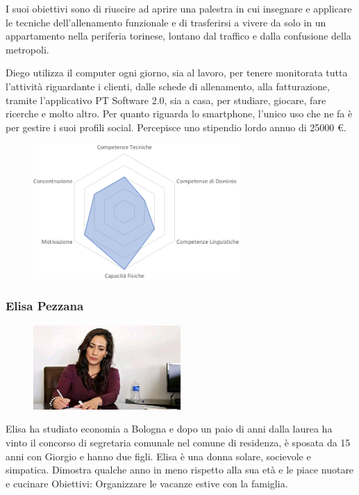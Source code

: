 \documentclass[12pt,italian,]{report}
\begin{document}
I suoi obiettivi sono di riuscire ad aprire una palestra in cui
insegnare e applicare le tecniche dell'allenamento funzionale e di
trasferirsi a vivere da solo in un appartamento nella periferia
torinese, lontano dal traffico e dalla confusione della metropoli.

Diego utilizza il computer ogni giorno, sia al lavoro, per tenere
monitorata tutta l'attività riguardante i clienti, dalle schede di
allenamento, alla fatturazione, tramite l'applicativo PT Software 2.0,
sia a casa, per studiare, giocare, fare ricerche e molto altro. Per
quanto riguarda lo smartphone, l'unico uso che ne fa è per gestire i
suoi profili social. Percepisce uno stipendio lordo annuo di 25000 €.

\begin{figure}[h]
\centering
\includegraphics[width=0.7\textwidth,height=\textheight]{img/diego_competenze.png}
\end{figure}


\hypertarget{elisa-pezzana-1}{%
\subsubsection{Elisa Pezzana}\label{elisa-pezzana-1}}

\begin{figure}[h]
\centering
\includegraphics[width=0.5\textwidth,height=\textheight]{img/elisa.jpg}
\end{figure}

Elisa ha studiato economia a Bologna e dopo un paio di anni dalla laurea
ha vinto il concorso di segretaria comunale nel comune di residenza, è
sposata da 15 anni con Giorgio e hanno due figli. Elisa è una donna
solare, socievole e simpatica. Dimostra qualche anno in meno rispetto
alla sua età e le piace nuotare e cucinare Obiettivi: Organizzare le
vacanze estive con la famiglia.
\end{document}
